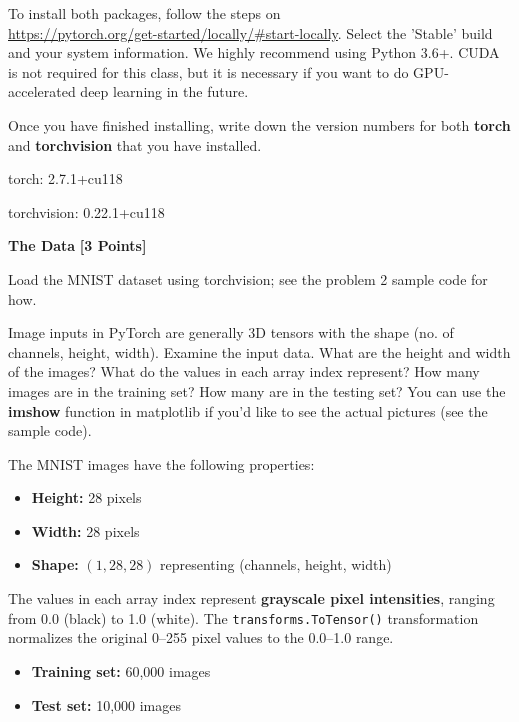To install both packages, follow the steps on \\
\url{https://pytorch.org/get-started/locally/#start-locally}. Select the 'Stable' build and your system information. We highly recommend using Python 3.6+. CUDA is not required for this class, but it is necessary if you want to do GPU-accelerated deep learning in the future.

Once you have finished installing, write down the version numbers for both \textbf{torch} and \textbf{torchvision} that you have installed.

\begin{solution}

torch: 2.7.1+cu118

torchvision:  0.22.1+cu118

\end{solution}

\newpage



\problem \textbf{The Data} \textbf{[3 Points]}

Load the MNIST dataset using torchvision; see the problem 2 sample code for how.

Image inputs in PyTorch are generally 3D tensors with the shape (no. of channels, height, width). Examine the input data. What are the height and width of the images? What do the values in each array index represent?  How many images are in the training set? How many are in the testing set? You can use the \textbf{imshow} function in matplotlib if you'd like to see the actual pictures (see the sample code).

\begin{subsolution}
  The MNIST images have the following properties:
  \begin{itemize}
      \item \textbf{Height:} 28 pixels
      \item \textbf{Width:} 28 pixels
      \item \textbf{Shape:} $(1, 28, 28)$ representing (channels, height, width)
  \end{itemize}

  The values in each array index represent \textbf{grayscale pixel intensities}, ranging from 0.0 (black) to 1.0 (white). The \texttt{transforms.ToTensor()} transformation normalizes the original 0--255 pixel values to the 0.0--1.0 range.

  \begin{itemize}
      \item \textbf{Training set:} 60,000 images
      \item \textbf{Test set:} 10,000 images
  \end{itemize}
\end{subsolution}


